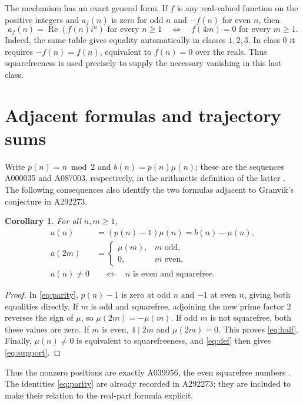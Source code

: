 \documentclass[11pt]{article}
\newtheorem{corollary}[theorem]{Corollary}
\newcommand{\Rea}{\operatorname{Re}}
\begin{document}
The mechanism has an exact general form. If $f$ is any real-valued
function on the positive integers and $a_f(n)$ is zero for odd $n$
and $-f(n)$ for even $n$, then
\[
 a_f(n)=\Rea(f(n)i^n)\text{ for every }n\geq1
 \quad\Longleftrightarrow\quad f(4m)=0\text{ for every }m\geq1.
\]
Indeed, the same table gives equality automatically in classes $1,2,3$.
In class $0$ it requires $-f(n)=f(n)$, equivalent to $f(n)=0$ over
the reals. Thus squarefreeness is used precisely to supply the necessary
vanishing in this last class.

\section{Adjacent formulas and trajectory sums}
Write $p(n)=n\bmod2$ and $b(n)=p(n)\mu(n)$; these are the sequences
A000035 and A087003, respectively, in the arithmetic definition of the
latter \cite{companion}. The following consequences also identify the
two formulas adjacent to Granvik's conjecture in A292273.

\begin{corollary}\label{cor:siblings}
For all $n,m\geq1$,
\begin{align}
 a(n)&=(p(n)-1)\mu(n)=b(n)-\mu(n),\label{eq:parity}\\
 a(2m)&=\begin{cases}\mu(m),&m\text{ odd},\\0,&m\text{ even},\end{cases}
 \label{eq:half}\\
 a(n)\ne0&\quad\Longleftrightarrow\quad n\text{ is even and squarefree}.
 \label{eq:support}
\end{align}
\end{corollary}
\begin{proof}
In \eqref{eq:parity}, $p(n)-1$ is zero at odd $n$ and $-1$ at even
$n$, giving both equalities directly. If $m$ is odd and squarefree,
adjoining the new prime factor $2$ reverses the sign of $\mu$, so
$\mu(2m)=-\mu(m)$. If odd $m$ is not squarefree, both these values
are zero. If $m$ is even, $4\mid 2m$ and $\mu(2m)=0$.
This proves \eqref{eq:half}. Finally, $\mu(n)\ne0$ is equivalent to
squarefreeness, and \eqref{eq:def} then gives \eqref{eq:support}.
\end{proof}
Thus the nonzero positions are exactly A039956, the even squarefree
numbers \cite{support}. The identities \eqref{eq:parity} are already
recorded in A292273; they are included to make their relation to the
real-part formula explicit.
\end{document}
